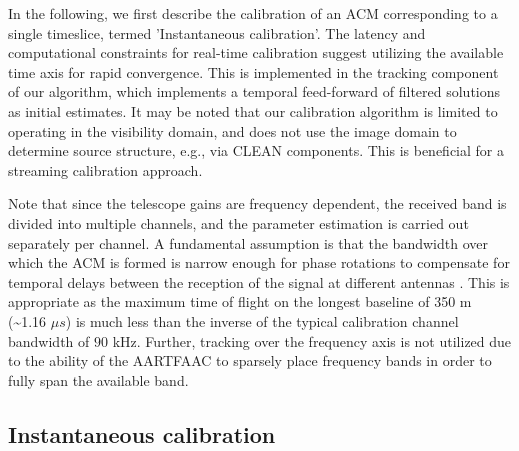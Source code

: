 \documentclass{aa}
\begin{document}
 In the  following,  we first  describe  the calibration  of an  ACM
corresponding to  a single  timeslice, termed 'Instantaneous  calibration'.  The
latency  and   computational  constraints  for   real-time  calibration  suggest
utilizing the available time axis  for rapid convergence. This is implemented in
the  tracking   component  of  our   algorithm,  which  implements   a  temporal
feed-forward of filtered  solutions as initial estimates.  It  may be noted that
our calibration algorithm is limited  to operating in the visibility domain, and
does not  use the image  domain to determine  source structure, e.g.,  via CLEAN
components. This is beneficial for a streaming calibration approach.

Note that since  the telescope gains are frequency  dependent, the received band
is divided into  multiple channels, and the parameter  estimation is carried out
separately per  channel.  A  fundamental assumption is  that the  bandwidth over
which the ACM  is formed is narrow enough for phase  rotations to compensate for
temporal   delays   between  the   reception   of   the   signal  at   different
antennas \citep{zatman1998narrow}.  This  is appropriate  as the maximum  time of
flight on the longest baseline of  350 m (\textasciitilde{}1.16 $\mu s$) is much
less than the inverse of the  typical calibration channel bandwidth of $90$ kHz.
Further, tracking over the frequency axis  is not utilized due to the ability of
the  AARTFAAC to  sparsely place  frequency  bands in  order to  fully span  the
available band.


\subsection{Instantaneous calibration}
\end{document}
